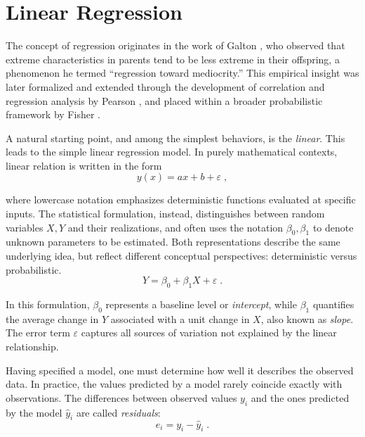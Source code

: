 \section{Linear Regression}

The concept of regression originates in the work of Galton \cite{galton_1886_regression}, who observed that extreme characteristics in parents tend to be less extreme in their offspring, a phenomenon he termed ``regression toward mediocrity.'' This empirical insight was later formalized and extended through the development of correlation and regression analysis by Pearson \cite{pearson_1895_contributions}, and placed within a broader probabilistic framework by Fisher \cite{fisher_1925_statistical}.

\medskip

A natural starting point, and among the simplest behaviors, is the \textit{linear}. This leads to the simple linear regression model. In purely mathematical contexts, linear relation is written in the form
\begin{equation}
    y(x) = ax + b + \varepsilon \; ,
\end{equation}

where lowercase notation emphasizes deterministic functions evaluated at specific inputs. The statistical formulation, instead, distinguishes between random variables \(X, Y\) and their realizations, and often uses the notation \(\beta_0, \beta_1\) to denote unknown parameters to be estimated. Both representations describe the same underlying idea, but reflect different conceptual perspectives: deterministic versus probabilistic.
\begin{equation}
    Y = \beta_0 + \beta_1 X + \varepsilon \; .
\end{equation}

In this formulation, \(\beta_0\) represents a baseline level or \textit{intercept}, while \(\beta_1\) quantifies the average change in \(Y\) associated with a unit change in \(X\), also known as \textit{slope}. The error term \(\varepsilon\) captures all sources of variation not explained by the linear relationship.

\medskip

Having specified a model, one must determine how well it describes the observed data. In practice, the values predicted by a model rarely coincide exactly with observations. The differences between observed values $y_i$ and the ones predicted by the model $\hat{y}_i$ are called \textit{residuals}:
\begin{equation}
    e_i = y_i - \hat{y}_i \; .
\end{equation}

